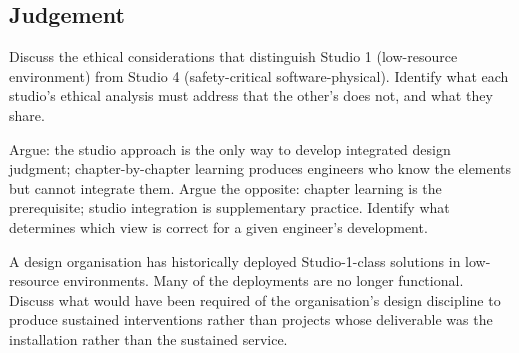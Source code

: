 \subsection*{Judgement}

\begin{exercise}
Discuss the ethical considerations that distinguish Studio 1 (low-resource environment) from Studio 4 (safety-critical software-physical). Identify what each studio's ethical analysis must address that the other's does not, and what they share.
\end{exercise}

\begin{exercise}
Argue: the studio approach is the only way to develop integrated design judgment; chapter-by-chapter learning produces engineers who know the elements but cannot integrate them. Argue the opposite: chapter learning is the prerequisite; studio integration is supplementary practice. Identify what determines which view is correct for a given engineer's development.
\end{exercise}

\begin{exercise}
A design organisation has historically deployed Studio-1-class solutions in low-resource environments. Many of the deployments are no longer functional. Discuss what would have been required of the organisation's design discipline to produce sustained interventions rather than projects whose deliverable was the installation rather than the sustained service.
\end{exercise}
